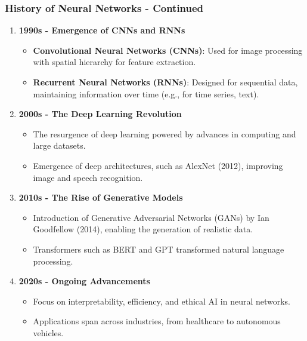 \documentclass{beamer}
\begin{document}
\begin{frame}[fragile]
    \frametitle{History of Neural Networks - Continued}
    \begin{enumerate}[resume]
        \item \textbf{1990s - Emergence of CNNs and RNNs}
            \begin{itemize}
                \item \textbf{Convolutional Neural Networks (CNNs)}: Used for image processing with spatial hierarchy for feature extraction.
                \item \textbf{Recurrent Neural Networks (RNNs)}: Designed for sequential data, maintaining information over time (e.g., for time series, text).
            \end{itemize}

        \item \textbf{2000s - The Deep Learning Revolution}
            \begin{itemize}
                \item The resurgence of deep learning powered by advances in computing and large datasets.
                \item Emergence of deep architectures, such as AlexNet (2012), improving image and speech recognition.
            \end{itemize}
        
        \item \textbf{2010s - The Rise of Generative Models}
            \begin{itemize}
                \item Introduction of Generative Adversarial Networks (GANs) by Ian Goodfellow (2014), enabling the generation of realistic data.
                \item Transformers such as BERT and GPT transformed natural language processing.
            \end{itemize}
        
        \item \textbf{2020s - Ongoing Advancements}
            \begin{itemize}
                \item Focus on interpretability, efficiency, and ethical AI in neural networks.
                \item Applications span across industries, from healthcare to autonomous vehicles.
            \end{itemize}
    \end{enumerate}
\end{frame}
\end{document}
